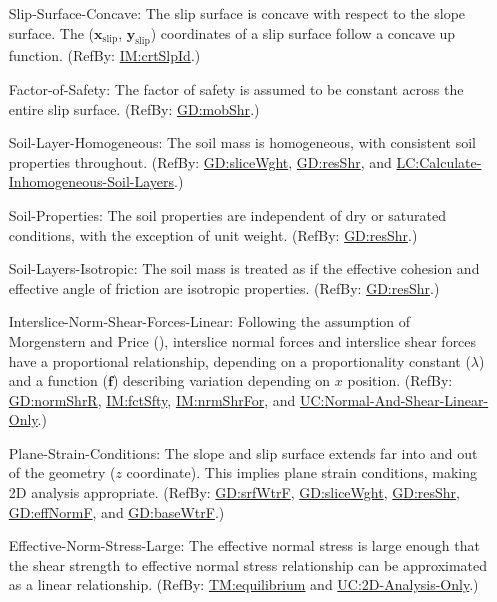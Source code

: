 \documentclass[12pt]{article}
\begin{document}
\begin{itemize}
\item[Slip-Surface-Concave:\phantomsection\label{assumpSSC}]{The slip surface is concave with respect to the slope surface. The (${\symbf{x}_{\text{slip}}}$, ${\symbf{y}_{\text{slip}}}$) coordinates of a slip surface follow a concave up function. (RefBy: \hyperref[IM:crtSlpId]{IM:crtSlpId}.)}
\item[Factor-of-Safety:\phantomsection\label{assumpFOS}]{The factor of safety is assumed to be constant across the entire slip surface. (RefBy: \hyperref[GD:mobShr]{GD:mobShr}.)}
\item[Soil-Layer-Homogeneous:\phantomsection\label{assumpSLH}]{The soil mass is homogeneous, with consistent soil properties throughout. (RefBy: \hyperref[GD:sliceWght]{GD:sliceWght}, \hyperref[GD:resShr]{GD:resShr}, and \hyperref[LC_inhomogeneous]{LC:Calculate-Inhomogeneous-Soil-Layers}.)}
\item[Soil-Properties:\phantomsection\label{assumpSP}]{The soil properties are independent of dry or saturated conditions, with the exception of unit weight. (RefBy: \hyperref[GD:resShr]{GD:resShr}.)}
\item[Soil-Layers-Isotropic:\phantomsection\label{assumpSLI}]{The soil mass is treated as if the effective cohesion and effective angle of friction are isotropic properties. (RefBy: \hyperref[GD:resShr]{GD:resShr}.)}
\item[Interslice-Norm-Shear-Forces-Linear:\phantomsection\label{assumpINSFL}]{Following the assumption of Morgenstern and Price (\cite{morgenstern1965}), interslice normal forces and interslice shear forces have a proportional relationship, depending on a proportionality constant ($λ$) and a function ($\symbf{f}$) describing variation depending on $x$ position. (RefBy: \hyperref[GD:normShrR]{GD:normShrR}, \hyperref[IM:fctSfty]{IM:fctSfty}, \hyperref[IM:nrmShrFor]{IM:nrmShrFor}, and \hyperref[UC_normshearlinear]{UC:Normal-And-Shear-Linear-Only}.)}
\item[Plane-Strain-Conditions:\phantomsection\label{assumpPSC}]{The slope and slip surface extends far into and out of the geometry ($z$ coordinate). This implies plane strain conditions, making 2D analysis appropriate. (RefBy: \hyperref[GD:srfWtrF]{GD:srfWtrF}, \hyperref[GD:sliceWght]{GD:sliceWght}, \hyperref[GD:resShr]{GD:resShr}, \hyperref[GD:effNormF]{GD:effNormF}, and \hyperref[GD:baseWtrF]{GD:baseWtrF}.)}
\item[Effective-Norm-Stress-Large:\phantomsection\label{assumpENSL}]{The effective normal stress is large enough that the shear strength to effective normal stress relationship can be approximated as a linear relationship. (RefBy: \hyperref[TM:equilibrium]{TM:equilibrium} and \hyperref[UC_2donly]{UC:2D-Analysis-Only}.)}

\end{itemize}
\end{document}

